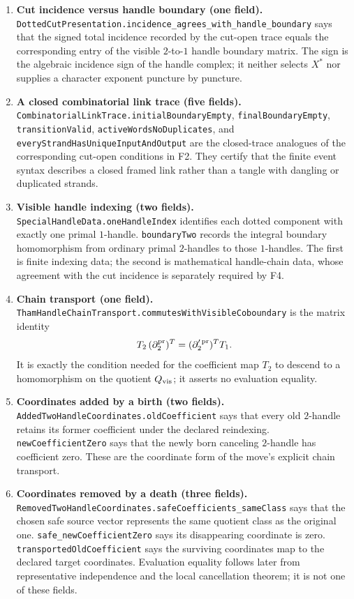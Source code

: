 \begin{enumerate}[label=\textbf{F\arabic*.},leftmargin=*]
\item \textbf{Cut incidence versus handle boundary (one field).}
\nolinkurl{DottedCutPresentation.incidence_agrees_with_handle_boundary} says
that the signed total incidence recorded by the cut-open trace equals the
corresponding entry of the visible $2$-to-$1$ handle boundary matrix.  The sign
is the algebraic incidence sign of the handle complex; it neither selects
$X^*$ nor supplies a character exponent puncture by puncture.

\item \textbf{A closed combinatorial link trace (five fields).}
\nolinkurl{CombinatorialLinkTrace.initialBoundaryEmpty},
\nolinkurl{finalBoundaryEmpty}, \nolinkurl{transitionValid},
\nolinkurl{activeWordsNoDuplicates}, and
\nolinkurl{everyStrandHasUniqueInputAndOutput} are the closed-trace analogues of
the corresponding cut-open conditions in F2.  They certify that the finite
event syntax describes a closed framed link rather than a tangle with dangling
or duplicated strands.

\item \textbf{Visible handle indexing (two fields).}
\nolinkurl{SpecialHandleData.oneHandleIndex} identifies each dotted component
with exactly one primal $1$-handle.  \texttt{boundaryTwo} records the integral
boundary homomorphism from ordinary primal $2$-handles to those $1$-handles.
The first is finite indexing data; the second is mathematical handle-chain
data, whose agreement with the cut incidence is separately required by F4.

\item \textbf{Chain transport (one field).}
\nolinkurl{ThamHandleChainTransport.commutesWithVisibleCoboundary} is the matrix
identity
\[
 T_2\,(\partial_2^{\rm pr})^T
 = (\partial_2^{\prime\,\rm pr})^T T_1.
\]
It is exactly the condition needed for the coefficient map $T_2$ to descend
to a homomorphism on the quotient $Q_{\rm vis}$; it asserts no evaluation
equality.

\item \textbf{Coordinates added by a birth (two fields).}
\nolinkurl{AddedTwoHandleCoordinates.oldCoefficient} says that every old
$2$-handle retains its former coefficient under the declared reindexing.
\nolinkurl{newCoefficientZero} says that the newly born canceling $2$-handle has
coefficient zero.  These are the coordinate form of the move's explicit chain
transport.

\item \textbf{Coordinates removed by a death (three fields).}
\nolinkurl{RemovedTwoHandleCoordinates.safeCoefficients_sameClass} says that the
chosen safe source vector represents the same quotient class as the original
one.  \nolinkurl{safe_newCoefficientZero} says its disappearing coordinate is
zero.  \nolinkurl{transportedOldCoefficient} says the surviving coordinates map
to the declared target coordinates.  Evaluation equality follows later from
representative independence and the local cancellation theorem; it is not one
of these fields.


\end{enumerate}
